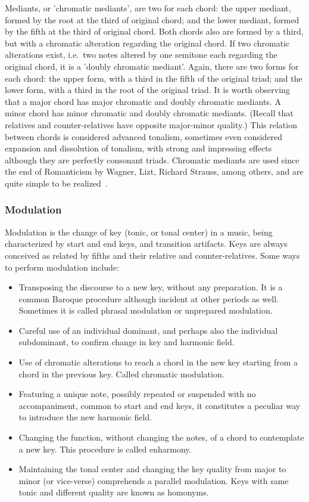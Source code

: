Mediants, or 'chromatic mediants', are two for each chord: the upper
mediant, formed by the root at the third of original chord; and the lower mediant, formed by the fifth at the third of original chord.
Both chords also are formed by a third, but with a chromatic alteration regarding the original chord. If two chromatic alterations exist, i.e.\ two notes altered by one semitone each regarding the original chord, it is a 'doubly chromatic mediant'. Again, there are two forms for each chord: the upper form, with a third in the fifth of the original triad; and the lower form, with a third in the root
of the original triad. It is worth observing that a major chord has major chromatic and doubly chromatic mediants. A minor chord has minor chromatic and doubly chromatic mediants. (Recall that relatives and counter-relatives have opposite major-minor quality.)
This relation between chords is considered advanced tonalism, sometimes even considered expansion and dissolution of tonalism,
with strong and impressing effects although they are perfectly consonant triads. Chromatic mediants are used since the end of Romanticism by Wagner, Lizt, Richard Strauss,
among others, and are quite simple to be realized~\cite{Harmonia,Salzer}. 


\subsubsection{Modulation}

Modulation is the change of key (tonic, or tonal center) in a music, being characterized by start and end keys, and transition artifacts.
Keys are always conceived as related by fifths and their relative and counter-relatives. Some ways to perform modulation include:

\begin{itemize}
    \item Transposing the discourse to a new key, without any preparation. It is a common Baroque procedure although incident at other periods as well. Sometimes it is 
    called phrasal modulation or unprepared modulation.
    \item  Careful use of an individual dominant, and perhaps also the individual
    subdominant, to confirm change in key and harmonic field.
    \item Use of chromatic alterations to reach a chord in the new key starting from a chord in the previous key. Called chromatic modulation.
    \item Featuring a unique note, possibly repeated or suspended with no accompaniment, common to start and end keys, it constitutes a peculiar way
    to introduce the new harmonic field.
    \item Changing the function, without changing the notes, of a chord to
    contemplate a new key. This procedure is called enharmony.
    \item Maintaining the tonal center and changing the key quality from major to minor
    (or vice-verse) comprehends a parallel modulation. Keys with same tonic and
    different quality are known as homonyms.
\end{itemize}

